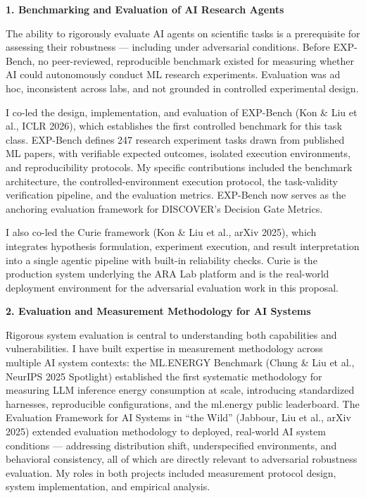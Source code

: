 \documentclass[10pt]{article}
\begin{document}
\textbf{1. Benchmarking and Evaluation of AI Research Agents}

The ability to rigorously evaluate AI agents on scientific tasks is a prerequisite for assessing their robustness — including under adversarial conditions. Before EXP-Bench, no peer-reviewed, reproducible benchmark existed for measuring whether AI could autonomously conduct ML research experiments. Evaluation was ad hoc, inconsistent across labs, and not grounded in controlled experimental design.

I co-led the design, implementation, and evaluation of EXP-Bench (Kon \& Liu et al., ICLR 2026), which establishes the first controlled benchmark for this task class. EXP-Bench defines 247 research experiment tasks drawn from published ML papers, with verifiable expected outcomes, isolated execution environments, and reproducibility protocols. My specific contributions included the benchmark architecture, the controlled-environment execution protocol, the task-validity verification pipeline, and the evaluation metrics. EXP-Bench now serves as the anchoring evaluation framework for DISCOVER's Decision Gate Metrics.

I also co-led the Curie framework (Kon \& Liu et al., arXiv 2025), which integrates hypothesis formulation, experiment execution, and result interpretation into a single agentic pipeline with built-in reliability checks. Curie is the production system underlying the ARA Lab platform and is the real-world deployment environment for the adversarial evaluation work in this proposal.

\medskip

\textbf{2. Evaluation and Measurement Methodology for AI Systems}

Rigorous system evaluation is central to understanding both capabilities and vulnerabilities. I have built expertise in measurement methodology across multiple AI system contexts: the ML.ENERGY Benchmark (Chung \& Liu et al., NeurIPS 2025 Spotlight) established the first systematic methodology for measuring LLM inference energy consumption at scale, introducing standardized harnesses, reproducible configurations, and the ml.energy public leaderboard. The Evaluation Framework for AI Systems in ``the Wild'' (Jabbour, Liu et al., arXiv 2025) extended evaluation methodology to deployed, real-world AI system conditions — addressing distribution shift, underspecified environments, and behavioral consistency, all of which are directly relevant to adversarial robustness evaluation. My roles in both projects included measurement protocol design, system implementation, and empirical analysis.
\end{document}
